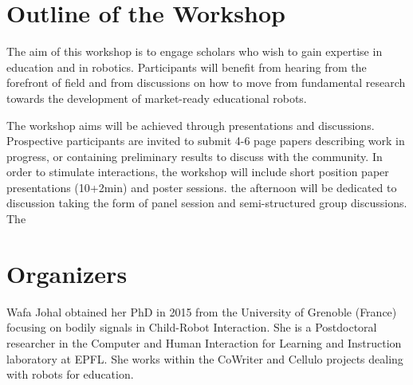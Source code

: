 \documentclass{sig-alternate-05-2015}
\begin{document}

\section{Outline of the Workshop}
The aim of this workshop is to engage scholars who wish to gain expertise in 
education and in robotics. Participants will benefit from hearing from the 
forefront of field and from discussions on how to move from fundamental research 
towards the development of market-ready educational robots.

The workshop aims will be achieved through presentations and discussions. 
Prospective participants are invited to submit 4-6 page papers describing work in progress, or containing preliminary results to discuss with the community.
In order to stimulate interactions, the workshop will include short position paper presentations (10+2min) and poster sessions. 
the afternoon will be dedicated to discussion taking the form of panel session and semi-structured group discussions. 
The 

\section{Organizers}
Wafa Johal obtained her PhD in 2015 from the University of Grenoble (France) focusing on bodily signals in Child-Robot Interaction. She is a Postdoctoral researcher in the Computer and Human Interaction for Learning and Instruction laboratory at EPFL. She works within the CoWriter and Cellulo projects dealing with robots for education. 
\end{document}
